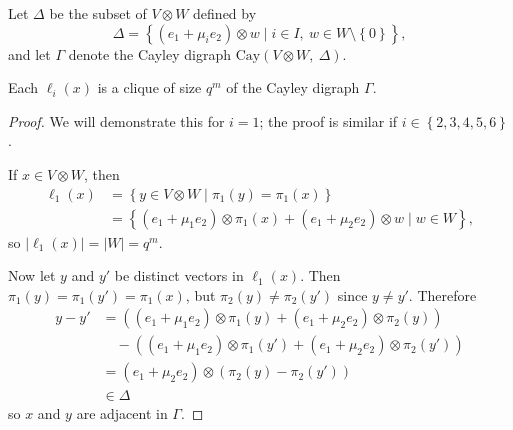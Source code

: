 \documentclass[ALCO, Unicode]{cedram}
\newcommand{\Cay}{\mathrm{Cay}}
\begin{document}
\begin{defi} \label{def:hamming-union}
Let $\Delta$ be the subset of $V \otimes W$ defined by
\begin{displaymath}
    \Delta = {\left\{\left(e_1 + \mu_i e_2 \right) \otimes w \mid i \in I,\ w \in W \setminus \left\{0 \right\}\right\}},
\end{displaymath}
and let $\Gamma$ denote the Cayley digraph $\Cay{\left(V \otimes W,\ \Delta \right)}$.
\end{defi}

\begin{lemma} \label{lm:cliques}
Each $\ell_i{\left(x \right)}$ is a clique of size $q^m$ of the Cayley digraph $\Gamma$.
\end{lemma}
\begin{proof}
We will demonstrate this for $i = 1$; the proof is similar if $i \in \left\{2, 3, 4, 5, 6 \right\}$.

If $x \in V \otimes W$, then
\begin{align*}
    \ell_1{\left(x \right)} &= \left\{y \in V \otimes W \mid \pi_1{\left(y \right)} = \pi_1{\left(x \right)}\right\} \\
    &= {\left\{\left(e_1 + \mu_1 e_2 \right) \otimes \pi_1{\left(x \right)} + \left(e_1 + \mu_2 e_2 \right) \otimes w \mid w \in W \right\}},
\end{align*}
so $\left|\ell_1{\left(x \right)} \right| = \left|W \right| = q^m$.

Now let $y$ and $y'$ be distinct vectors in $\ell_1{\left(x \right)}$. Then $\pi_1{\left(y \right)} = \pi_1{\left(y' \right)} = \pi_1{\left(x \right)}$, but $\pi_2{\left(y \right)} \neq \pi_2{\left(y' \right)}$ since $y \neq y'$. Therefore
\begin{align*}
    y-y' &= \left(\left(e_1 + \mu_1 e_2 \right) \otimes \pi_1{\left(y \right)} + \left(e_1 + \mu_2 e_2 \right) \otimes \pi_2{\left(y \right)}\right) \\
    & \quad - \left(\left(e_1 + \mu_1 e_2 \right) \otimes \pi_1{\left(y' \right)} + \left(e_1 + \mu_2 e_2 \right) \otimes \pi_2{\left(y' \right)}\right) \\
    &= \left(e_1 + \mu_2 e_2 \right) \otimes \left(\pi_2{\left(y \right)} - \pi_2{\left(y' \right)}\right) \\
    &\in \Delta
\end{align*}
so $x$ and $y$ are adjacent in $\Gamma$.
\end{proof}
\end{document}
